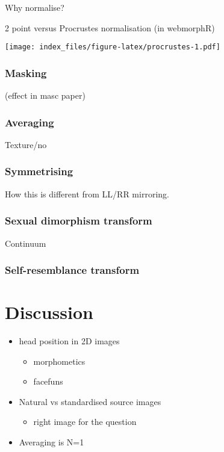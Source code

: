 \documentclass[
  english,
  man]{apa6}
\providecommand{\tightlist}{%
  \setlength{\itemsep}{0pt}\setlength{\parskip}{0pt}}
\begin{document}
Why normalise?

2 point versus Procrustes normalisation (in webmorphR)

\texttt{[image: index\_files/figure-latex/procrustes-1.pdf]}

\hypertarget{masking}{%
\subsubsection{Masking}\label{masking}}

(effect in masc paper)

\hypertarget{averaging-2}{%
\subsubsection{Averaging}\label{averaging-2}}

Texture/no

\hypertarget{symmetrising}{%
\subsubsection{Symmetrising}\label{symmetrising}}

How this is different from LL/RR mirroring.

\hypertarget{sexual-dimorphism-transform}{%
\subsubsection{Sexual dimorphism transform}\label{sexual-dimorphism-transform}}

Continuum

\hypertarget{self-resemblance-transform}{%
\subsubsection{Self-resemblance transform}\label{self-resemblance-transform}}

\hypertarget{discussion}{%
\section{Discussion}\label{discussion}}

\begin{itemize}
\tightlist
\item
  head position in 2D images

  \begin{itemize}
  \tightlist
  \item
    morphometics
  \item
    facefuns
  \end{itemize}
\item
  Natural vs standardised source images

  \begin{itemize}
  \tightlist
  \item
    right image for the question
  \end{itemize}
\item
  Averaging is N=1
\end{itemize}
\end{document}
